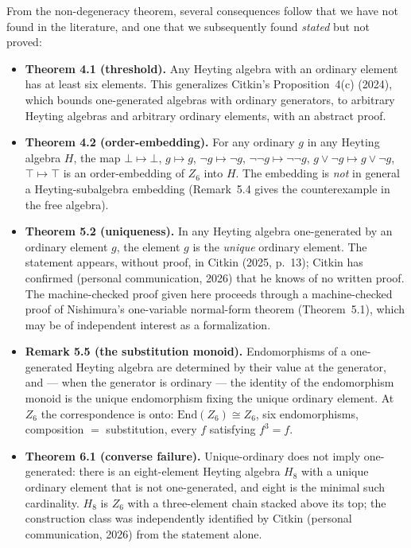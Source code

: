 ﻿\documentclass[11pt]{amsart}
\theoremstyle{plain}
\theoremstyle{definition}
\theoremstyle{remark}
\newcommand{\Znn}[1]{Z_{#1}}
\begin{document}
From the non-degeneracy theorem, several consequences follow that we have not
found in the literature, and one that we subsequently found \emph{stated} but
not proved:

\begin{itemize}
\item \textbf{Theorem 4.1 (threshold).} Any Heyting algebra with an ordinary
element has at least six elements. This generalizes Citkin's
Proposition~4(c) (2024), which bounds one-generated algebras with ordinary
generators, to arbitrary Heyting algebras and arbitrary ordinary elements,
with an abstract proof.
\item \textbf{Theorem 4.2 (order-embedding).} For any ordinary $g$ in any
Heyting algebra $H$, the map $\bot \mapsto \bot$, $g \mapsto g$,
$\neg g \mapsto \neg g$, $\neg\neg g \mapsto \neg\neg g$,
$g \vee \neg g \mapsto g \vee \neg g$, $\top \mapsto \top$ is an
order-embedding of $\Znn{6}$ into $H$. The embedding is \emph{not} in general
a Heyting-subalgebra embedding (Remark~5.4 gives the counterexample in the
free algebra).
\item \textbf{Theorem 5.2 (uniqueness).} In any Heyting algebra one-generated
by an ordinary element $g$, the element $g$ is the \emph{unique} ordinary
element. The statement appears, without proof, in Citkin (2025, p.~13);
Citkin has confirmed (personal communication, 2026) that he knows of no
written proof. The machine-checked proof given here proceeds through a
machine-checked proof of Nishimura's one-variable normal-form theorem
(Theorem~5.1), which may be of independent interest as a formalization.
\item \textbf{Remark 5.5 (the substitution monoid).} Endomorphisms of a
one-generated Heyting algebra are determined by their value at the generator,
and --- when the generator is ordinary --- the identity of the endomorphism
monoid is the unique endomorphism fixing the unique ordinary element. At
$\Znn{6}$ the correspondence is onto:
$\mathrm{End}(\Znn{6}) \cong \Znn{6}$, six endomorphisms, composition $=$
substitution, every $f$ satisfying $f^3 = f$.
\item \textbf{Theorem 6.1 (converse failure).} Unique-ordinary does not imply
one-generated: there is an eight-element Heyting algebra $H_8$ with a unique
ordinary element that is not one-generated, and eight is the minimal such
cardinality. $H_8$ is $\Znn{6}$ with a three-element chain stacked above its
top; the construction class was independently identified by Citkin (personal
communication, 2026) from the statement alone.

\end{itemize}
\end{document}
